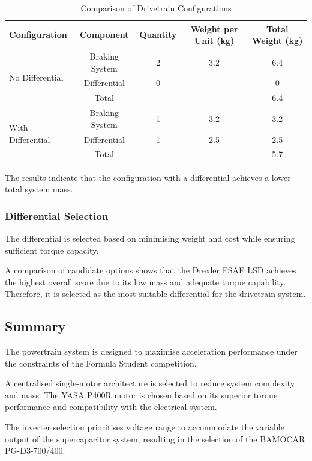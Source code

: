 \documentclass[a4paper,12pt]{article}
\begin{document}
\begin{table}[H]
\centering
\caption{Comparison of Drivetrain Configurations}
\label{tab:drivetrain_comparison}
\begin{tabular}{lcccc}
\toprule
Configuration & Component & Quantity & Weight per Unit (kg) & Total Weight (kg) \\
\midrule
\multirow{3}{*}{No Differential} 
& Braking System & 2 & 3.2 & 6.4 \\
& Differential & 0 & -- & 0 \\
& Total & & & 6.4 \\
\midrule
\multirow{3}{*}{With Differential} 
& Braking System & 1 & 3.2 & 3.2 \\
& Differential & 1 & 2.5 & 2.5 \\
& Total & & & 5.7 \\
\bottomrule
\end{tabular}
\end{table}

The results indicate that the configuration with a differential achieves a lower total system mass.

\subsubsection{Differential Selection}

The differential is selected based on minimising weight and cost while ensuring sufficient torque capacity.

A comparison of candidate options shows that the Drexler FSAE LSD achieves the highest overall score due to its low mass and adequate torque capability. Therefore, it is selected as the most suitable differential for the drivetrain system.

\subsection{Summary}

The powertrain system is designed to maximise acceleration performance under the constraints of the Formula Student competition.

A centralised single-motor architecture is selected to reduce system complexity and mass. The YASA P400R motor is chosen based on its superior torque performance and compatibility with the electrical system.

The inverter selection prioritises voltage range to accommodate the variable output of the supercapacitor system, resulting in the selection of the BAMOCAR PG-D3-700/400.
\end{document}

